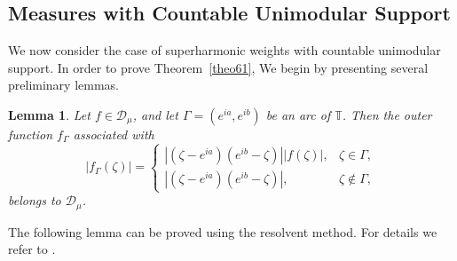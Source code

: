 \documentclass[12pt,reqno,a4paper]{amsart}
\newtheorem{lem}[prop]{Lemma}
\newtheorem{exe}[prop]{Example}
\newcommand{\Lat}{\mathrm{Lat}}
\newcommand{\cM}{{\mathcal{M}}}
\newcommand{\hH}{\mathrm{H^2 }}
\newcommand\TT{\mathbb{T}}
\newcommand\DD{\mathbb{D}}
\newcommand\NN{\mathbb{N}}
\newcommand{\cD}{{\mathcal{D}}}
\numberwithin{equation}{section}
\begin{document}
	
	
	\subsection{Measures with Countable Unimodular Support}\label{Countable}
	We now consider the case of superharmonic weights with countable unimodular support. In order to prove Theorem~\ref{theo61}, We begin by presenting several preliminary lemmas.
	\begin{lem}\label{Lemma1}
		Let $f\in \cD_\mu$, and let $\Gamma=(e^{ia},e^{ib})$ be an arc of $\TT$. Then the outer function $f_\Gamma $ associated with
		\[
		|f_\Gamma (\zeta)| = 
		\begin{cases} 
			|(\zeta - e^{ia})(e^{ib} - \zeta)| |f(\zeta)|, & \zeta \in \Gamma, \\
			|(\zeta - e^{ia})(e^{ib} - \zeta)|, & \zeta \notin \Gamma,
		\end{cases}
		\]
		belongs to $\cD_\mu$.		
	\end{lem}
	The following lemma can be proved using the resolvent method. For details we refer to \cite{EEK}.	
	
\end{document}
